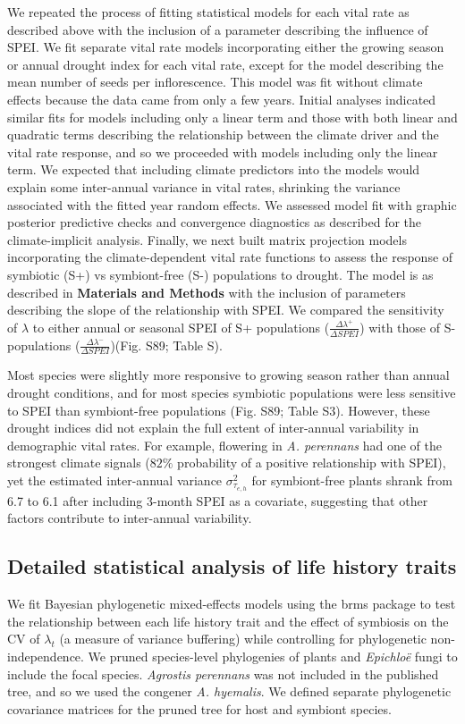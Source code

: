 \documentclass[lineno, sn-basic]{sn-jnl}%
\begin{document}
We repeated the process of fitting statistical models for each vital rate as described above with the inclusion of a parameter describing the influence of SPEI. 
We fit separate vital rate models incorporating either the growing season or annual drought index for each vital rate, except for the model describing the mean number of seeds per inflorescence. 
This model was fit without climate effects because the data came from only a few years.
Initial analyses indicated similar fits for models including only a linear term and those with both linear and quadratic terms describing the relationship between the climate driver and the vital rate response, and so we proceeded with models including only the linear term.
We expected that including climate predictors into the models would explain some inter-annual variance in vital rates, shrinking the variance associated with the fitted year random effects.
We assessed model fit with graphic posterior predictive checks and convergence diagnostics as described for the climate-implicit analysis. 
Finally, we next built matrix projection models incorporating the climate-dependent vital rate functions to assess the response of symbiotic (S+) vs symbiont-free (S-) populations to drought. 
The model is as described in \textbf{Materials and Methods} with the inclusion of parameters describing the slope of the relationship with SPEI. 
We compared the sensitivity of $\lambda$ to either annual or seasonal SPEI of S+ populations ($\frac{\Delta\lambda^{+}}{\Delta SPEI}$) with those of S- populations ($\frac{\Delta\lambda^{-}}{\Delta SPEI}$)(Fig. S89; Table S).

Most species were slightly more responsive to growing season rather than annual drought conditions, and for most species symbiotic populations were less sensitive to SPEI than symbiont-free populations (Fig. S89; Table S3).
However, these drought indices did not explain the full extent of inter-annual variability in demographic vital rates.
For example, flowering in \emph{A. perennans} had one of the strongest climate signals ($82\%$ probability of a positive relationship with SPEI), yet the estimated inter-annual variance $\sigma^2_{\tau_{e,h}}$ for symbiont-free plants shrank from 6.7 to 6.1 after including 3-month SPEI as a covariate, suggesting that other factors contribute to inter-annual variability.


\subsection{Detailed statistical analysis of life history traits}\label{SupMethods4}
We fit Bayesian phylogenetic mixed-effects models using the brms package \citep{Burkner2017brms} to test the relationship between each life history trait and the effect of symbiosis on the CV of $\lambda_{t}$ (a measure of variance buffering) while controlling for phylogenetic non-independence.
We pruned species-level phylogenies of plants \citep{zanne2014three} and \emph{Epichlo\"{e}} fungi \citep{leuchtmann2014nomenclatural} to include the focal species.
\emph{Agrostis perennans} was not included in the published tree, and so we used the congener \emph{A. hyemalis}. 
We defined separate phylogenetic covariance matrices for the pruned tree for host and symbiont species.
\end{document}
